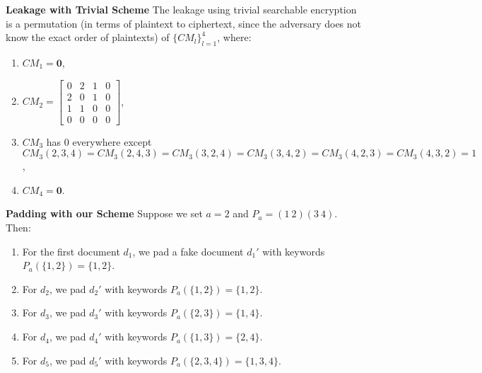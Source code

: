 \documentclass{article}
\newcommand{\doc}{d}
\newcommand{\cmatrix}{CM}
\begin{document}
\textbf{Leakage with Trivial Scheme} The leakage using trivial searchable encryption is a permutation (in terms of plaintext to ciphertext, since the adversary does not know the exact order of plaintexts) of $\{\cmatrix_l\}_{l=1}^{4}$, where:
\begin{enumerate}
	\item $\cmatrix_1 = \textbf{0}$,
	
	\item $\cmatrix_2 = 
	\begin{bmatrix}
	0 & 2 & 1 & 0\\ 
	2 & 0 & 1 & 0\\ 
	1 & 1 & 0 & 0\\ 
	0 & 0 & 0 & 0 
	\end{bmatrix}$,
	
	\item $\cmatrix_3$ has 0 everywhere except $\cmatrix_3(2,3,4) = \cmatrix_3(2,4,3) = \cmatrix_3(3,2,4) = \cmatrix_3(3,4,2) = \cmatrix_3(4,2,3) = \cmatrix_3(4,3,2) = 1$,
	
	\item $\cmatrix_4 = \textbf{0}$.
\end{enumerate}

\textbf{Padding with our Scheme} Suppose we set $a=2$ and $P_a = (1 \ 2)(3 \ 4)$. Then:
\begin{enumerate}
	\item For the first document $\doc_1$, we pad a fake document $\doc_1'$ with keywords $P_a(\{1,2\}) = \{1,2\}$.
	
	\item For $d_2$, we pad $\doc_2'$ with keywords $P_a(\{1,2\}) = \{1,2\}$.
	
	\item For $d_3$, we pad $\doc_3'$ with keywords $P_a(\{2,3\}) = \{1,4\}$.
	
	\item For $d_4$, we pad $\doc_4'$ with keywords $P_a(\{1,3\}) = \{2,4\}$.
	
	\item For $d_5$, we pad $\doc_5'$ with keywords $P_a(\{2,3,4\}) = \{1,3,4\}$.
\end{enumerate}
\end{document}
